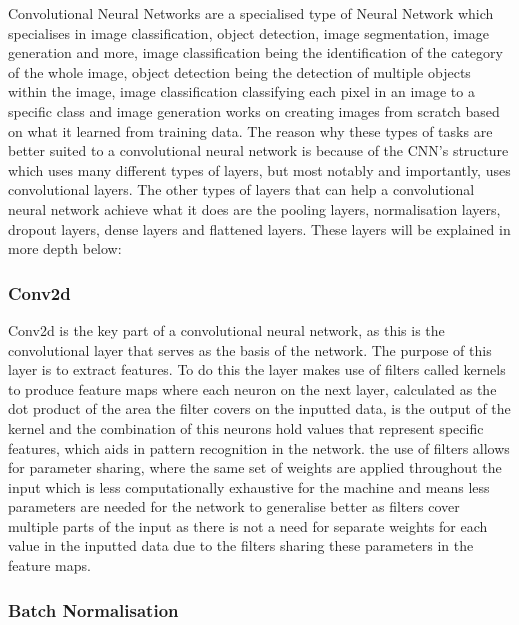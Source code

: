 \documentclass[]{final_report}
\begin{document}
Convolutional Neural Networks are a specialised type of Neural Network which specialises in image classification, object detection, image segmentation, image generation and more, image classification being the identification of the category of the whole image, object detection being the detection of multiple objects within the image, image classification classifying each pixel in an image to a specific class and image generation works on creating images from scratch based on what it learned from training data. The reason why these types of tasks are better suited to a convolutional neural network is because of the CNN’s structure which uses many different types of layers, but most notably and importantly, uses convolutional layers. The other types of layers that can help a convolutional neural network achieve what it does are the pooling layers, normalisation layers, dropout layers, dense layers and flattened layers. These layers will be explained in more depth below: 

\subsubsection{Conv2d}

Conv2d is the key part of a convolutional neural network, as this is the convolutional layer that serves as the basis of the network. The purpose of this layer is to extract features. To do this the layer makes use of filters called kernels to produce feature maps where each neuron on the next layer, calculated as the dot product of the area the filter covers on the inputted data,  is the output of the kernel and the combination of this neurons hold values that represent specific features, which aids in pattern recognition in the network. the use of filters allows for parameter sharing, where the same set of weights are applied throughout the input which is less computationally exhaustive for the machine and means less parameters are needed for the network to generalise better as filters cover multiple parts of the input as there is not a need for separate weights for each value in the inputted data due to the filters sharing these parameters in the feature maps. 

\subsubsection{Batch Normalisation}
\end{document}
